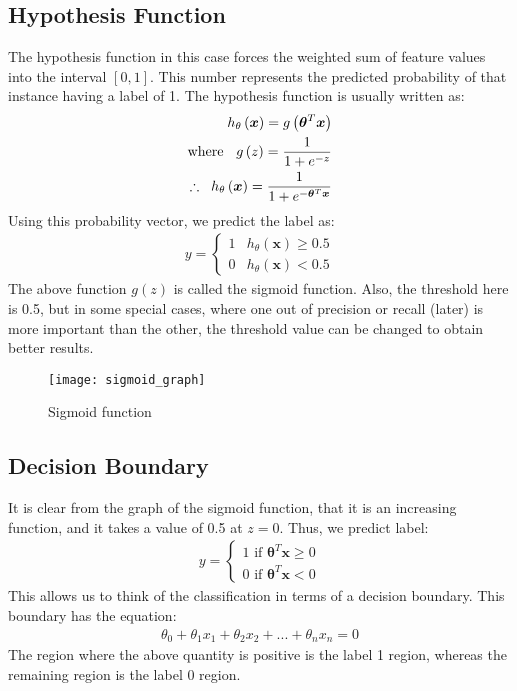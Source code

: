 \documentclass[a4paper, 12pt]{article}
\begin{document}
\subsection{Hypothesis Function}
The hypothesis function in this case forces the weighted sum of feature values into the interval $\left[0, 1\right]$. This number represents the predicted probability of that instance having a label of 1. The hypothesis function is usually written as:
\begin{align*}
h_{\theta}\left(\bm{x}\right) = g\left(\bm{\theta}^T\bm{x}\right) \\
\text{where } \hspace{2mm} g\left(z\right) = \dfrac{1}{1+e^{-z}} \\
\therefore \hspace{2mm} h_{\theta}\left(\bm{x}\right) = \dfrac{1}{1+e^{-\bm{\theta}^T\bm{x}}}
\end{align*}
Using this probability vector, we predict the label as:
\begin{align*}
y =
\begin{cases}
1 & h_{\theta}\left(\bm{x}\right) \geq 0.5 \\
0 & h_{\theta}\left(\bm{x}\right) < 0.5
\end{cases}
\end{align*}
The above function $g\left(z\right)$ is called the sigmoid function. Also, the threshold here is 0.5, but in some special cases, where one out of precision or recall (later) is more important than the other, the threshold value can be changed to obtain better results.
\begin{figure}[H]
\centering
\texttt{[image: sigmoid\_graph]}
\caption{Sigmoid function}
\end{figure}

\subsection{Decision Boundary}
It is clear from the graph of the sigmoid function, that it is an increasing function, and it takes a value of 0.5 at $z = 0$. Thus, we predict label:
\begin{align*}
y =
\begin{cases}
1 \text{ if } \bm{\theta}^T\bm{x} \geq 0 \\
0 \text{ if } \bm{\theta}^T\bm{x} < 0
\end{cases}
\end{align*}
This allows us to think of the classification in terms of a decision boundary. This boundary has the equation:
\begin{align*}
\theta_0 + \theta_1x_1 + \theta_2x_2 + ... + \theta_nx_n = 0
\end{align*}
The region where the above quantity is positive is the label 1 region, whereas the remaining region is the label 0 region.
\end{document}
